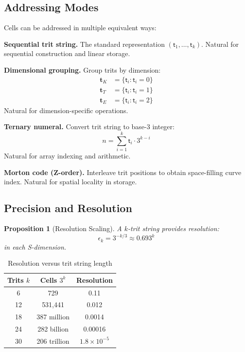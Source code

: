 \documentclass[twocolumn,10pt]{article}
\newtheorem{proposition}[theorem]{Proposition}
\theoremstyle{remark}
\newcommand{\tmark}{\mathsf{t}}
\begin{document}
\subsection{Addressing Modes}

Cells can be addressed in multiple equivalent ways:

\textbf{Sequential trit string.} The standard representation $(\tmark_1, \ldots, \tmark_k)$. Natural for sequential construction and linear storage.

\textbf{Dimensional grouping.} Group trits by dimension:
\begin{align}
\mathbf{t}_K &= \{\tmark_i : \tmark_i = 0\} \\
\mathbf{t}_T &= \{\tmark_i : \tmark_i = 1\} \\
\mathbf{t}_E &= \{\tmark_i : \tmark_i = 2\}
\end{align}
Natural for dimension-specific operations.

\textbf{Ternary numeral.} Convert trit string to base-3 integer:
\begin{equation}
n = \sum_{i=1}^{k} \tmark_i \cdot 3^{k-i}
\end{equation}
Natural for array indexing and arithmetic.

\textbf{Morton code (Z-order).} Interleave trit positions to obtain space-filling curve index. Natural for spatial locality in storage.

\subsection{Precision and Resolution}

\begin{proposition}[Resolution Scaling]
\label{prop:resolution}
A $k$-trit string provides resolution:
\begin{equation}
\epsilon_k = 3^{-k/3} \approx 0.693^k
\end{equation}
in each S-dimension.
\end{proposition}

\begin{table}[h]
\centering
\begin{tabular}{ccc}
\toprule
Trits $k$ & Cells $3^k$ & Resolution \\
\midrule
6 & 729 & 0.11 \\
12 & 531,441 & 0.012 \\
18 & 387 million & 0.0014 \\
24 & 282 billion & 0.00016 \\
30 & 206 trillion & $1.8 \times 10^{-5}$ \\
\bottomrule
\end{tabular}
\caption{Resolution versus trit string length}
\label{tab:resolution}
\end{table}
\end{document}
